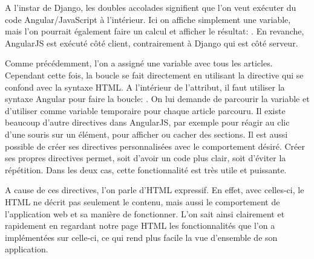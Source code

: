 \documentclass[a4paper,10pt,twoside]{sphinxmanual}
\begin{document}
A l'instar de Django, les doubles accolades signifient que l'on veut exécuter du code Angular/JavaScript à l'intérieur. Ici on affiche simplement une variable, mais l'on pourrait également faire un calcul et afficher le résultat: . En revanche, AngularJS est exécuté côté client, contrairement à Django qui est côté serveur.

Comme précédemment, l'on a assigné une variable avec tous les articles. Cependant cette fois, la boucle se fait directement en utilisant la directive  qui se confond avec la syntaxe HTML. A l'intérieur de l'attribut, il faut utiliser la syntaxe Angular pour faire la boucle: . On lui demande de parcourir la variable  et d'utiliser comme variable temporaire  pour chaque article parcouru. Il existe beaucoup d'autre directives dans AngularJS, par exemple pour réagir au clic d'une souris sur un élément, pour afficher ou cacher des sections. Il est aussi possible de créer ses directives personnalisées avec le comportement désiré. Créer ses propres directives permet, soit d'avoir un code plus clair, soit d'éviter la répétition. Dans les deux cas, cette fonctionnalité est très utile et puissante.

A cause de ces directives, l'on parle d'HTML expressif. En effet, avec celles-ci, le HTML ne décrit pas seulement le contenu, mais aussi le comportement de l'application web et sa manière de fonctionner. L'on sait ainsi clairement et rapidement en regardant notre page HTML les fonctionnalités que l'on a implémentées sur celle-ci, ce qui rend plus facile la vue d'ensemble de son application.
\end{document}
